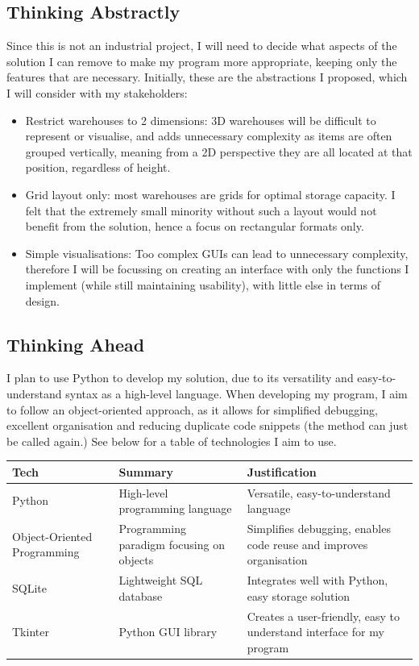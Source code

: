 \subsection{Thinking Abstractly}
Since this is not an industrial project, I will need to decide what aspects of the solution I can remove to make my program more appropriate, keeping only the features that are necessary. Initially, these are the abstractions I proposed, which I will consider with my stakeholders:

\begin{itemize}
    \item Restrict warehouses to 2 dimensions: 3D warehouses will be difficult to represent or visualise, and adds unnecessary complexity as items are often grouped vertically, meaning from a 2D perspective they are all located at that position, regardless of height.

    \item Grid layout only: most warehouses are grids for optimal storage capacity. I felt that the extremely small minority without such a layout would not benefit from the solution, hence a focus on rectangular formats only.

    \item Simple visualisations: Too complex GUIs can lead to unnecessary complexity, therefore I will be focussing on creating an interface with only the functions I implement (while still maintaining usability), with little else in terms of design.
\end{itemize}

\subsection{Thinking Ahead}

I plan to use Python to develop my solution, due to its versatility and easy-to-understand syntax as a high-level language. When developing my program, I aim to follow an object-oriented approach, as it allows for simplified debugging, excellent organisation and reducing duplicate code snippets (the method can just be called again.) See below for a table of technologies I aim to use.


\begin{table}[h]
\centering
\begin{tabular}{|p{3cm}|p{5cm}|p{6cm}|}
\hline
\textbf{Tech} & \textbf{Summary} & \textbf{Justification} \\
\hline
Python & High-level programming language & Versatile, easy-to-understand language \\
\hline
Object-Oriented Programming & Programming paradigm focusing on objects & Simplifies debugging, enables code reuse and improves organisation \\
\hline
SQLite & Lightweight SQL database & Integrates well with Python, easy storage solution \\
\hline
Tkinter & Python GUI library & Creates a user-friendly, easy to understand interface for my program\\
\hline
\end{tabular}
\end{table}

